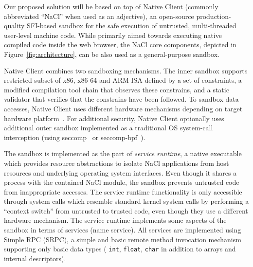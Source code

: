Our proposed solution will be based on top of Native Client (commonly
abbreviated ``NaCl'' when used as an adjective), an open-source
production-quality SFI-based sandbox for the safe execution of
untrusted, multi-threaded user-level machine code. While primarily aimed
towards executing native compiled code inside the web browser, the NaCl
core components, depicted in Figure~\ref{fig:architecture}, can be also
used as a general-purpose sandbox.


Native Client combines two sandboxing mechanisms. The inner sandbox
supports restricted subset of x86, x86-64 and ARM ISA defined by a set
of constraints, a modified compilation tool chain that observes these
constrains, and a static validator that verifies that the constrains
have been followed. To sandbox data accesses, Native Client uses
different hardware mechanisms depending on target hardware
platform~\cite{yee:ieee-sp09,sehr:usenix-sec10}. For additional
security, Native Client optionally uses additional outer sandbox
implemented as a traditional OS system-call interception (\eg using
seccomp~\cite{seccomp:linux} or
seccomp\mbox{-}bpf~\cite{seccomp-bpf:linux}).

The sandbox is implemented as the part of \emph{service runtime}, a native
executable which provides resource abstractions to isolate NaCl
applications from host resources and underlying operating system
interfaces. Even though it shares a process with the contained NaCl
module, the sandbox prevents untrusted code from inappropriate accesses.
The service runtime functionality is only accessible through system
calls which resemble standard kernel system calls by performing a
``context switch'' from untrusted to trusted code, even though they use
a different hardware mechanism. The service runtime implements some
aspects of the sandbox in terms of services (\eg name service). All
services are implemented using Simple RPC (SRPC), a simple and basic
remote method invocation mechanism supporting only basic data types (\ie
\lstinline`int`, \lstinline`float`, \lstinline`char` in addition to
arrays and internal descriptors).



